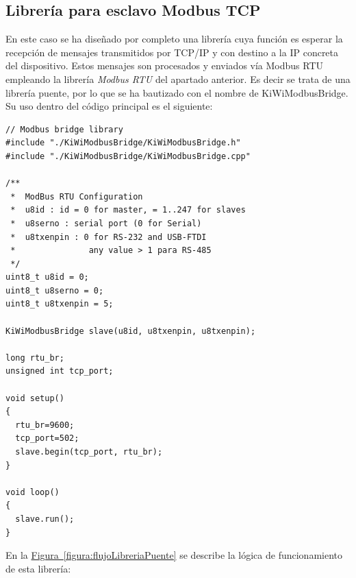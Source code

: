 \subsection{Librería para esclavo Modbus TCP}
\label{subsec:esclavoTCPkiwi}

En este caso se ha diseñado por completo una librería cuya función es esperar la recepción de mensajes transmitidos por TCP/IP y con destino a la IP concreta del dispositivo. Estos mensajes son procesados y enviados vía Modbus RTU empleando la librería \textit{Modbus RTU} del apartado anterior. Es decir se trata de una librería puente, por lo que se ha bautizado con el nombre de KiWiModbusBridge. Su uso dentro del código principal es el siguiente:

\vspace*{\fill}

\begin{lstlisting}
// Modbus bridge library
#include "./KiWiModbusBridge/KiWiModbusBridge.h"
#include "./KiWiModbusBridge/KiWiModbusBridge.cpp"

/**
 *  ModBus RTU Configuration
 *  u8id : id = 0 for master, = 1..247 for slaves
 *  u8serno : serial port (0 for Serial)
 *  u8txenpin : 0 for RS-232 and USB-FTDI 
 *               any value > 1 para RS-485
 */
uint8_t u8id = 0; 
uint8_t u8serno = 0;   
uint8_t u8txenpin = 5;  

KiWiModbusBridge slave(u8id, u8txenpin, u8txenpin);

long rtu_br;
unsigned int tcp_port;

void setup()
{
  rtu_br=9600;
  tcp_port=502;
  slave.begin(tcp_port, rtu_br);
}

void loop()
{
  slave.run();
}

\end{lstlisting}

\vspace*{\fill}

\clearpage

En la \hyperref[figura:flujoLibreriaPuente]{Figura~\ref{figura:flujoLibreriaPuente}} se describe la lógica de funcionamiento de esta librería:


